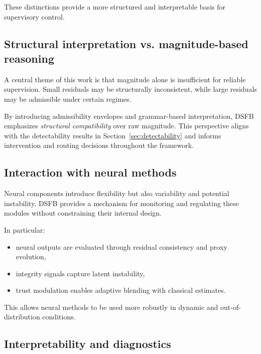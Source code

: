 \documentclass[11pt,letterpaper]{article}
\theoremstyle{gcresult}
\theoremstyle{definition}
\begin{document}
These distinctions provide a more structured and interpretable basis for supervisory control.


\subsection{Structural interpretation vs. magnitude-based reasoning}

A central theme of this work is that magnitude alone is insufficient for reliable supervision. Small residuals may be structurally inconsistent, while large residuals may be admissible under certain regimes.

By introducing admissibility envelopes and grammar-based interpretation, DSFB emphasizes \emph{structural compatibility} over raw magnitude. This perspective aligns with the detectability results in Section~\ref{sec:detectability} and informs intervention and routing decisions throughout the framework.


\subsection{Interaction with neural methods}

Neural components introduce flexibility but also variability and potential instability. DSFB provides a mechanism for monitoring and regulating these modules without constraining their internal design.

In particular:
\begin{itemize}[leftmargin=1.5em]
    \item neural outputs are evaluated through residual consistency and proxy evolution,
    \item integrity signals capture latent instability,
    \item trust modulation enables adaptive blending with classical estimates.
\end{itemize}

This allows neural methods to be used more robustly in dynamic and out-of-distribution conditions.


\subsection{Interpretability and diagnostics}
\end{document}
